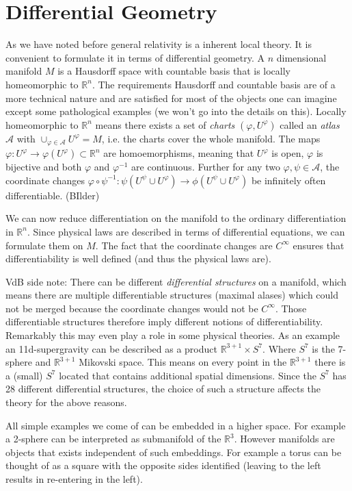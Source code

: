 \chapter{Differential Geometry}
As we have noted before general relativity is a inherent local theory. It is convenient to formulate it in terms of differential geometry.
A $n$ dimensional manifold $M$ is a Hausdorff space with countable basis that is locally homeomorphic to $\mathbb{R}^n$. The requirements Hausdorff and countable basis are of a more technical nature and are satisfied for most of the objects one can imagine except some pathological examples (we won't go into the details on this).
Locally homeomorphic to $\mathbb{R}^n$ means there exists a set of \emph{charts} $(\varphi,U^\varphi)$ called an \emph{atlas} $\mathcal{A}$ with $\cup_{\varphi\in\mathcal{A}} U^\varphi =M$, i.e. the charts cover the whole manifold. The maps $\varphi:U^\varphi\to \varphi(U^\varphi)\subset\mathbb{R}^n $ are homoemorphisms, meaning that $U^\varphi$ is open, $\varphi$ is bijective and both $\varphi$ and $\varphi^{-1}$ are continuous.
Further for any two $\varphi,\psi\in \mathcal{A}$, the coordinate changes $\varphi\circ\psi^{-1}:\psi(U^\psi\cup U^\varphi)\to \phi(U^\psi\cup U^\varphi)$ be infinitely often differentiable.
(BIlder)\par
We can now reduce differentiation on the manifold to the ordinary differentiation in $\mathbb{R}^n$. Since physical laws are described in terms of differential equations, we can formulate them on $M$. The fact that the coordinate changes are $C^\infty$ ensures that differentiability is well defined (and thus the physical laws are).\par
VdB side note: There can be different \emph{differential structures} on a manifold, which means there are multiple differentiable structures (maximal alases) which could not be merged because the coordinate changes would not be $C^\infty$. Those differentiable structures therefore imply different notions of differentiability. Remarkably this may even play a role in some physical theories. As an example an 11d-supergravity can be described as a product $\mathbb{R}^{3+1}\times S^7$. Where $S^7$ is the 7-sphere and $\mathbb{R}^{3+1}$ Mikovski space.
This means on every point in the $\mathbb{R}^{3+1}$ there is a (small) $S^7$  located that contains additional spatial dimensions. Since the $S^7$ has 28 different differential structures, the choice of such a structure affects the theory for the above reasons.\par
All simple examples we come of can be embedded in a higher space. For example a 2-sphere can be interpreted as submanifold of the $\mathbb{R}^3$. However manifolds are objects that exists independent of such embeddings. For example a torus can be thought of as a square with the opposite sides identified (leaving to the left results in re-entering in the left).
